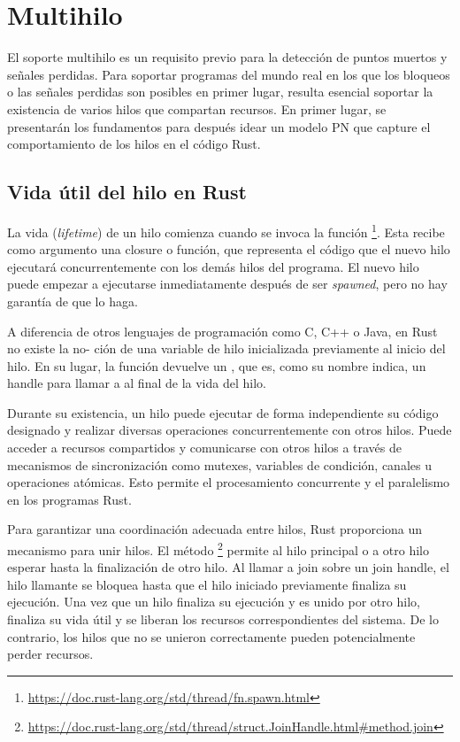 \section{Multihilo}

El soporte multihilo es un requisito previo para la detección de puntos muertos y señales
perdidas. Para soportar programas del mundo real en los que los bloqueos o las señales
perdidas son posibles en primer lugar, resulta esencial soportar la existencia de varios hilos que
compartan recursos. En primer lugar, se presentarán los fundamentos para después idear un
modelo \acrshort{PN} que capture el comportamiento de los hilos en el código Rust.

\subsection{Vida útil del hilo en Rust}

La vida (\textit{lifetime}) de un hilo comienza cuando se invoca la función
\footnote{\url{https://doc.rust-lang.org/std/thread/fn.spawn.html}}.
Esta recibe como argumento una closure o función, que representa el
código que el nuevo hilo ejecutará concurrentemente con los demás hilos del programa. El
nuevo hilo puede empezar a ejecutarse inmediatamente después de ser \emph{spawned},
pero no hay garantía de que lo haga.

A diferencia de otros lenguajes de programación como C, C++ o Java, en Rust no existe la
no- ción de una variable de hilo inicializada previamente al inicio del hilo. En su lugar, la
función  devuelve un , que es, como su nombre
indica, un handle para llamar a  al final de la vida del hilo.

Durante su existencia, un hilo puede ejecutar de forma independiente su código designado y
realizar diversas operaciones concurrentemente con otros hilos. Puede acceder a recursos
compartidos y comunicarse con otros hilos a través de mecanismos de sincronización como
mutexes, variables de condición, canales u operaciones atómicas. Esto permite el
procesamiento concurrente y el paralelismo en los programas Rust.

Para garantizar una coordinación adecuada entre hilos, Rust proporciona un mecanismo
para unir hilos.
El método \footnote{\url{https://doc.rust-lang.org/std/thread/struct.JoinHandle.html\#method.join}}
permite al hilo principal o a otro hilo
esperar hasta la finalización de otro hilo. Al llamar a join sobre un join handle, el hilo
llamante se bloquea hasta que el hilo iniciado previamente finaliza su ejecución. Una vez que un hilo
finaliza su ejecución y es unido por otro hilo, finaliza su vida útil y se liberan los recursos
correspondientes del sistema. De lo contrario, los hilos que no se unieron correctamente
pueden potencialmente perder recursos.


